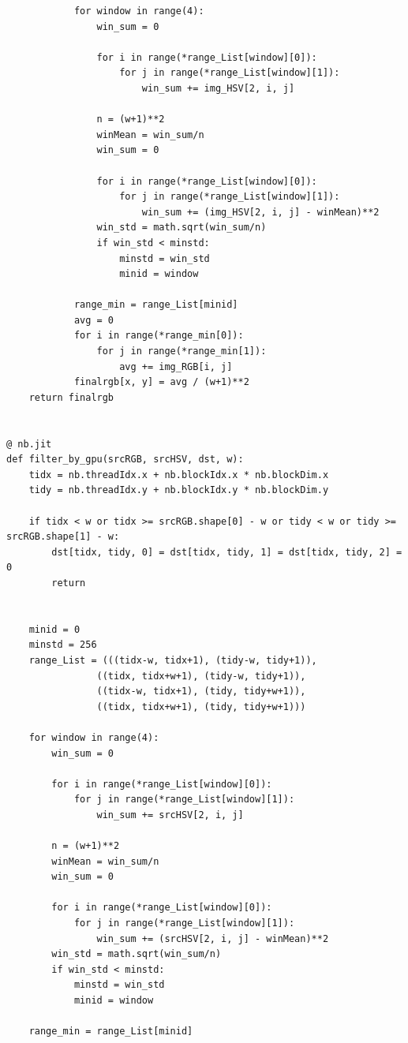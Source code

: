 \documentclass{article}
\begin{document}
\begin{verbatim}
            for window in range(4):
                win_sum = 0

                for i in range(*range_List[window][0]):
                    for j in range(*range_List[window][1]):
                        win_sum += img_HSV[2, i, j]

                n = (w+1)**2
                winMean = win_sum/n
                win_sum = 0

                for i in range(*range_List[window][0]):
                    for j in range(*range_List[window][1]):
                        win_sum += (img_HSV[2, i, j] - winMean)**2
                win_std = math.sqrt(win_sum/n)
                if win_std < minstd:
                    minstd = win_std
                    minid = window

            range_min = range_List[minid]
            avg = 0
            for i in range(*range_min[0]):
                for j in range(*range_min[1]):
                    avg += img_RGB[i, j]
            finalrgb[x, y] = avg / (w+1)**2
    return finalrgb


@ nb.jit
def filter_by_gpu(srcRGB, srcHSV, dst, w):
    tidx = nb.threadIdx.x + nb.blockIdx.x * nb.blockDim.x
    tidy = nb.threadIdx.y + nb.blockIdx.y * nb.blockDim.y

    if tidx < w or tidx >= srcRGB.shape[0] - w or tidy < w or tidy >= srcRGB.shape[1] - w:
        dst[tidx, tidy, 0] = dst[tidx, tidy, 1] = dst[tidx, tidy, 2] = 0
        return


    minid = 0
    minstd = 256
    range_List = (((tidx-w, tidx+1), (tidy-w, tidy+1)),
                ((tidx, tidx+w+1), (tidy-w, tidy+1)),
                ((tidx-w, tidx+1), (tidy, tidy+w+1)),
                ((tidx, tidx+w+1), (tidy, tidy+w+1)))

    for window in range(4):
        win_sum = 0

        for i in range(*range_List[window][0]):
            for j in range(*range_List[window][1]):
                win_sum += srcHSV[2, i, j]

        n = (w+1)**2
        winMean = win_sum/n
        win_sum = 0

        for i in range(*range_List[window][0]):
            for j in range(*range_List[window][1]):
                win_sum += (srcHSV[2, i, j] - winMean)**2
        win_std = math.sqrt(win_sum/n)
        if win_std < minstd:
            minstd = win_std
            minid = window

    range_min = range_List[minid]


\end{verbatim}
\end{document}
